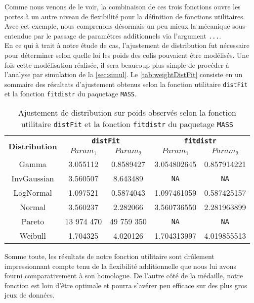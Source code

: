 Comme nous venons de le voir, la combinaison de ces trois fonctions ouvre les portes à un autre niveau de flexibilité pour la définition de fonctions utilitaires. Avec cet exemple, nous comprenons désormais un peu mieux la mécanique sous-entendue par le passage de paramètres additionnels via l'argument \texttt{...}. \\

En ce qui à trait à notre étude de cas, l'ajustement de distribution fut nécessaire pour déterminer selon quelle loi les poids des colis pouvaient être modélisés. Une fois cette modélisation réalisée, il sera beaucoup plus simple de procéder à l'analyse par simulation de la \autoref{sec:simul}. Le \autoref{tab:weightDistFit} consiste en un sommaire des résultats d'ajustement obtenus selon la fonction utilitaire \texttt{distFit} et la fonction \texttt{fitdistr} du paquetage \texttt{MASS}. \\

\begin{table}
	\centering
	\begin{tabular}{ccccc}
		\multirow{2}{*}{\textbf{Distribution}} & \multicolumn{2}{c}{\textbf{\texttt{distFit}}} & \multicolumn{2}{c}{\textbf{\texttt{fitdistr}}} \\
		& \textbf{$Param_1$} & \textbf{$Param_2$} & \textbf{$Param_1$} & \textbf{$Param_2$} \\
		\hline
		Gamma & 3.055112 & 0.8589427 & 3.054802645 & 0.857914221 \\
		InvGaussian & 3.560507 & 8.643489 & \texttt{NA} & \texttt{NA} \\
		LogNormal & 1.097521 & 0.5874043 & 1.097461059 & 0.587425157 \\
		Normal & 3.560237 & 2.282066 & 3.560736550 & 2.281963899 \\
		Pareto & 13 974 470 & 49 759 350 & \texttt{NA} & \texttt{NA} \\
		Weibull & 1.704325 & 4.020126 & 1.704313997 & 4.019855513 \\
	\end{tabular}
	\caption{Ajustement de distribution sur poids observés selon la fonction utilitaire \texttt{distFit} et la fonction \texttt{fitdistr} du paquetage \texttt{MASS}}
	\label{tab:weightDistFit}
\end{table}


Somme toute, les résultats de notre fonction utilitaire sont drôlement impressionnant compte tenu de la flexibilité additionnelle que nous lui avons fourni comparativement à son homologue. De l'autre côté de la médaille, notre fonction est loin d'être optimale et pourra s'avérer peu efficace sur des plus gros jeux de données. \\

